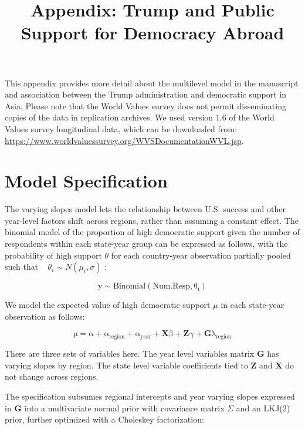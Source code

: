 \documentclass[12pt]{article}
\title{\textbf{Appendix: Trump and Public Support for Democracy Abroad}}
\date{}
\begin{document}
\maketitle 

\singlespace 

This appendix provides more detail about the multilevel model in the manuscript and association between the Trump administration and democratic support in Asia. 
Please note that the World Values survey does not permit disseminating copies of the data in replication archives. 
We used version 1.6 of the World Values survey longitudinal data, which can be downloaded from: \url{https://www.worldvaluessurvey.org/WVSDocumentationWVL.jsp}.



\section{Model Specification} 



The varying slopes model lets the relationship between U.S. success and other year-level factors shift across regions, rather than assuming a constant effect. 
The binomial model of the proportion of high democratic support given the number of respondents within each state-year group can be expressed as follows, with the probability of high support $\theta$ for each country-year observation partially pooled such that ~ $\theta_i \sim N(\mu_i, \sigma)$ : 


\begin{equation}
\mathrm{ y \sim Binomial(Num. Resp, \theta_i)}
\end{equation} 

We model the expected value of high democratic support $\mu$ in each state-year observation as follows:

\begin{equation}
\mathrm{ \mu = \alpha + \alpha_{region} + \alpha_{year} + \textbf{X} \beta + \textbf{Z} \gamma +  \textbf{G} \lambda_{region}} 
\end{equation} 

There are three sets of variables here. 
The year level variables matrix $\textbf{G}$ has varying slopes by region.
The state level variable coefficients tied to $\textbf{Z}$ and $\textbf{X}$ do not change across regions. 


The specification subsumes regional intercepts and year varying slopes expressed in $\textbf{G}$ into a multivariate normal prior with covariance matrix $\Sigma$ and an LKJ(2) prior, further optimized with a Choleskey factorization: 
\end{document}
